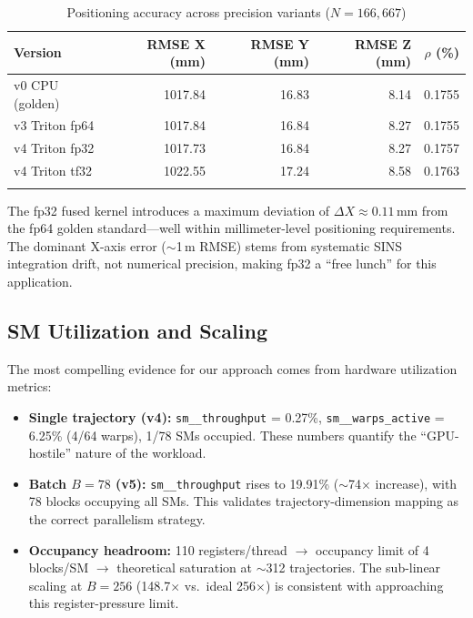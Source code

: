 \documentclass[pdflatex,sn-mathphys-num]{sn-jnl}%
\theoremstyle{thmstyleone}%
\theoremstyle{thmstyletwo}%
\theoremstyle{thmstylethree}%
\begin{document}
\begin{table}[h]
\caption{Positioning accuracy across precision variants ($N=166{,}667$)}\label{tab:accuracy}
\begin{tabular}{@{}lrrrr@{}}
\toprule
Version & RMSE X (mm) & RMSE Y (mm) & RMSE Z (mm) & $\rho$ (\%) \\
\midrule
v0 CPU (golden) & 1017.84 & 16.83 & 8.14 & 0.1755 \\
v3 Triton fp64 & 1017.84 & 16.84 & 8.27 & 0.1755 \\
v4 Triton fp32 & 1017.73 & 16.84 & 8.27 & 0.1757 \\
v4 Triton tf32 & 1022.55 & 17.24 & 8.58 & 0.1763 \\
\botrule
\end{tabular}
\end{table}

The fp32 fused kernel introduces a maximum deviation of $\Delta X \approx 0.11$\,mm from the fp64 golden standard---well within millimeter-level positioning requirements. The dominant X-axis error ($\sim$1\,m RMSE) stems from systematic SINS integration drift, not numerical precision, making fp32 a ``free lunch'' for this application.

\subsection{SM Utilization and Scaling}\label{subsec:sm_util}

The most compelling evidence for our approach comes from hardware utilization metrics:

\begin{itemize}
\item \textbf{Single trajectory (v4):} \texttt{sm\_\_throughput} = 0.27\%, \texttt{sm\_\_warps\_active} = 6.25\% (4/64 warps), 1/78 SMs occupied. These numbers quantify the ``GPU-hostile'' nature of the workload.
\item \textbf{Batch $B=78$ (v5):} \texttt{sm\_\_throughput} rises to 19.91\% ($\sim$74$\times$ increase), with 78 blocks occupying all SMs. This validates trajectory-dimension mapping as the correct parallelism strategy.
\item \textbf{Occupancy headroom:} 110 registers/thread $\rightarrow$ occupancy limit of 4 blocks/SM $\rightarrow$ theoretical saturation at $\sim$312 trajectories. The sub-linear scaling at $B=256$ (148.7$\times$ vs.~ideal 256$\times$) is consistent with approaching this register-pressure limit.
\end{itemize}
\end{document}
